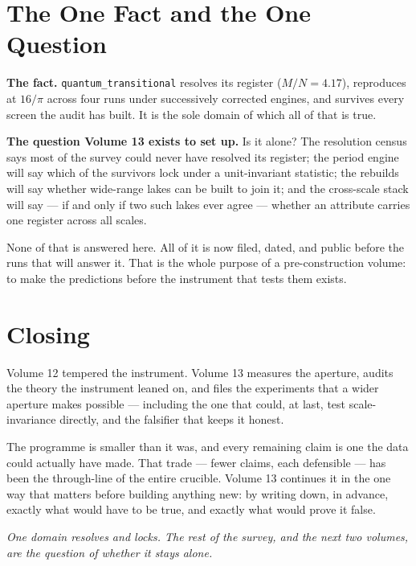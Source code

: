 \documentclass[11pt, letterpaper, openany]{book}
\newcommand{\MN}{M/N}
\begin{document}
\section{The One Fact and the One Question}

\begin{signalbox}
\textbf{The fact.} \texttt{quantum\_transitional} resolves its register ($\MN = 4.17$), reproduces
at $16/\pi$ across four runs under successively corrected engines, and survives every screen the
audit has built. It is the sole domain of which all of that is true.

\medskip
\textbf{The question Volume 13 exists to set up.} Is it alone? The resolution census says most of
the survey could never have resolved its register; the period engine will say which of the survivors
lock under a unit-invariant statistic; the rebuilds will say whether wide-range lakes can be built to
join it; and the cross-scale stack will say --- if and only if two such lakes ever agree --- whether
an attribute carries one register across all scales.

\medskip
\noindent None of that is answered here. All of it is now filed, dated, and public before the runs
that will answer it. That is the whole purpose of a pre-construction volume: to make the predictions
before the instrument that tests them exists.
\end{signalbox}

\section{Closing}

Volume 12 tempered the instrument. Volume 13 measures the aperture, audits the theory the instrument
leaned on, and files the experiments that a wider aperture makes possible --- including the one that
could, at last, test scale-invariance directly, and the falsifier that keeps it honest.

The programme is smaller than it was, and every remaining claim is one the data could actually have
made. That trade --- fewer claims, each defensible --- has been the through-line of the entire
crucible. Volume 13 continues it in the one way that matters before building anything new: by writing
down, in advance, exactly what would have to be true, and exactly what would prove it false.

\begin{center}
\vspace{0.5em}
\itshape One domain resolves and locks. The rest of the survey, and the next two volumes, are the
question of whether it stays alone.
\vspace{0.5em}
\end{center}
\end{document}
